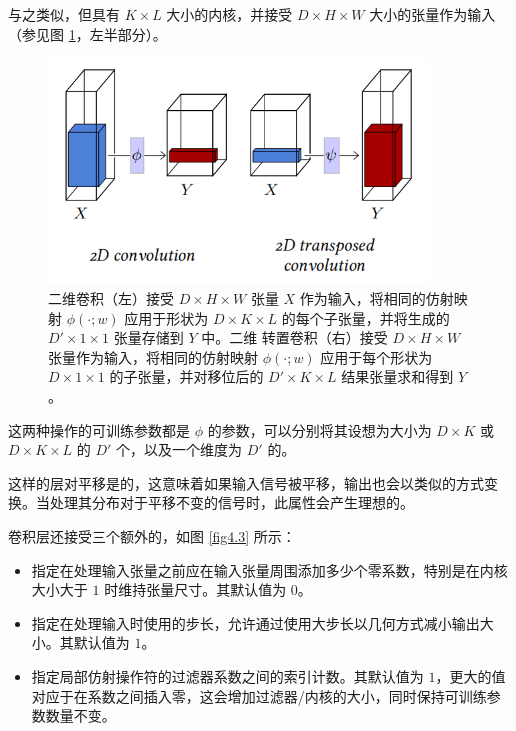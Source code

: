 与之类似，但具有 $K \times L$ 大小的内核，并接受 $D \times H \times W$ 大小的张量作为输入（参见图 \ref{fig4.2}，左半部分）。

\begin{figure}[h]
    \centering
    \includegraphics[width=0.9\textwidth]{fig/fig4.2.png}
    \caption[二维卷积]{二维卷积（左）接受 $D \times H \times W$ 张量 $X$ 作为输入，将相同的仿射映射 $\phi(\cdot;w)$ 应用于形状为 $D \times K \times L$ 的每个子张量，并将生成的 $D' \times 1 \times 1$ 张量存储到 $Y$ 中。二维 转置卷积（右）接受 $D \times H \times W$ 张量作为输入，将相同的仿射映射 $\phi(\cdot;w)$ 应用于每个形状为 $D \times 1 \times 1$ 的子张量，并对移位后的 $D' \times K \times L$ 结果张量求和得到 $Y$。}
    \label{fig4.2}
\end{figure}



这两种操作的可训练参数都是 $\phi$ 的参数，可以分别将其设想为大小为 $D \times K$ 或 $D \times K \times L$ 的 $D'$ 个，以及一个维度为 $D'$ 的。

这样的层对平移是的，这意味着如果输入信号被平移，输出也会以类似的方式变换。当处理其分布对于平移不变的信号时，此属性会产生理想的。

卷积层还接受三个额外的，如图 \ref{fig4.3} 所示：

\begin{itemize}
    \item {}指定在处理输入张量之前应在输入张量周围添加多少个零系数，特别是在内核大小大于 $1$ 时维持张量尺寸。其默认值为 $0$。
    \item {}指定在处理输入时使用的步长，允许通过使用大步长以几何方式减小输出大小。其默认值为 $1$。
    \item {}指定局部仿射操作符的过滤器系数之间的索引计数。其默认值为 $1$，更大的值对应于在系数之间插入零，这会增加过滤器/内核的大小，同时保持可训练参数数量不变。
\end{itemize}


